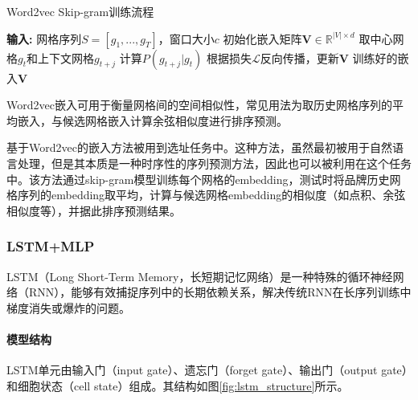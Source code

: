 \documentclass{article}
\begin{document}
\begin{algorithm}[H]
\caption{Word2vec Skip-gram训练流程}
\begin{algorithmic}[1]
\State \textbf{输入:} 网格序列$S = [g_1, ..., g_T]$，窗口大小$c$
\State 初始化嵌入矩阵$\mathbf{V} \in \mathbb{R}^{|V| \times d}$
        \State 取中心网格$g_t$和上下文网格$g_{t+j}$
        \State 计算$P(g_{t+j} | g_t)$
        \State 根据损失$\mathcal{L}$反向传播，更新$\mathbf{V}$
    \EndFor
\EndFor
\State \Return 训练好的嵌入$\mathbf{V}$
\end{algorithmic}
\end{algorithm}

Word2vec嵌入可用于衡量网格间的空间相似性，常见用法为取历史网格序列的平均嵌入，与候选网格嵌入计算余弦相似度进行排序预测。

基于Word2vec的嵌入方法被用到选址任务中。这种方法，虽然最初被用于自然语言处理，但是其本质是一种时序性的序列预测方法\cite{mohan_link_2021}，因此也可以被利用在这个任务中。该方法通过skip-gram模型训练每个网格的embedding，测试时将品牌历史网格序列的embedding取平均，计算与候选网格embedding的相似度（如点积、余弦相似度等），并据此排序预测结果。

\subsubsection{LSTM+MLP}

LSTM（Long Short-Term Memory，长短期记忆网络）是一种特殊的循环神经网络（RNN），能够有效捕捉序列中的长期依赖关系，解决传统RNN在长序列训练中梯度消失或爆炸的问题\cite{hochreiter_long_1997}。

\paragraph{模型结构}
LSTM单元由输入门（input gate）、遗忘门（forget gate）、输出门（output gate）和细胞状态（cell state）组成。其结构如图\ref{fig:lstm_structure}所示。
\end{document}
